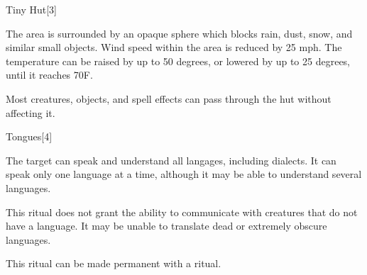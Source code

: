 \begin{spellsection}{Tiny Hut}[3]
    \begin{spellheader}
    \end{spellheader}
    \begin{spellcontent}
        \begin{spelltargetinginfo}
        \end{spelltargetinginfo}
        \begin{spelleffects}

            \spellline
            \spelleffect The area is surrounded by an opaque sphere which blocks rain, dust, snow, and similar small objects. Wind speed within the area is reduced by 25 mph. The temperature can be raised by up to 50 degrees, or lowered by up to 25 degrees, until it reaches 70\degree F.
            \spelldur \durext \dismissable
        \end{spelleffects}
    \end{spellcontent}
    \begin{spellfooter}
        \spellnotes Most creatures, objects, and spell effects can pass through the hut without affecting it.
    \end{spellfooter}
\end{spellsection}

\begin{spellsection}{Tongues}[4]
    \begin{spellheader}
    \end{spellheader}
    \begin{spellcontent}
        \begin{spelltargetinginfo}
        \end{spelltargetinginfo}
        \begin{spelleffects}

            \spelleffect The target can speak and understand all langages, including dialects. It can speak only one language at a time, although it may be able to understand several languages.
            \spelldur \durlong
        \end{spelleffects}
    \end{spellcontent}
    \begin{spellfooter}
        \spellnotes This ritual does not grant the ability to communicate with creatures that do not have a language. It may be unable to translate dead or extremely obscure languages. 

        This ritual can be made permanent with a  ritual.
    \end{spellfooter}
\end{spellsection}

